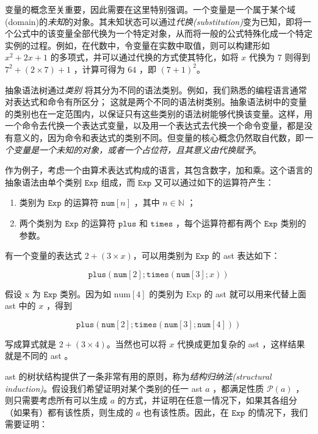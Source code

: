 变量的概念至关重要，因此需要在这里特别强调。一个变量是一个属于某个域(domain)的\emph{未知}的对象。其未知状态可以通过\emph{代换(substitution)}变为已知，即将一个公式中的该变量全部代换为一个特定对象，从而将一般的公式特殊化成一个特定实例的过程。例如，在代数中，令变量在实数中取值，则可以构建形如
\(x^2+2x+1\) 的多项式，并可以通过代换的方式使其特化，如将 \(x\) 代换为
\(7\) 则得到 \(7^2+(2\times 7)+1\) ，计算可得为 \(64\) ，即
\((7+1)^2\)。

抽象语法树通过\emph{类别}
将其分为不同的语法类别。例如，我们熟悉的编程语言通常对表达式和命令有所区分；
这就是两个不同的语法树类别。抽象语法树中的变量的类别也在一定范围内，以保证只有这些类别的语法树能够代换该变量。这样，用一个命令去代换一个表达式变量，以及用一个表达式去代换一个命令变量，都是没有意义的，因为命令和表达式的类别不同。但变量的核心概念仍然取自代数，即\emph{一个变量是一个未知的对象，或者一个占位符，且其意义由代换赋予}。

作为例子，考虑一个由算术表达式构成的语言，其包含数字，加和乘。这个语言的抽象语法由单个类别
\(\texttt{Exp}\) 组成，而 \(\texttt{Exp}\) 又可以通过如下的运算符产生：

\begin{enumerate}
\def\labelenumi{\arabic{enumi}.}
\item
  类别为 \(\texttt{Exp}\) 的运算符 \(\texttt{num}[n]\) ，其中
  \(n \in \mathbb{N}\) ；
\item
  两个类别为 \(\texttt{Exp}\) 的运算符 \(\texttt{plus}\) 和
  \(\texttt{times}\) ，每个运算符都有两个 \(\texttt{Exp}\) 类别的参数。
\end{enumerate}

有一个变量的表达式 \(2+(3\times x)\)，可以用类别为 \(\texttt{Exp}\) 的
ast 表达如下：

\[\texttt{plus}(\texttt{num}[2]; \texttt{times}(\texttt{num}[3];x))\]

假设 x 为 \(\texttt{Exp}\) 类别。因为如 \(\text{num}[4]\) 的类别为
\(\text{Exp}\) 的 ast 就可以用来代替上面 ast 中的 \(x\) ，得到

\[\texttt{plus}(\texttt{num}[2]; \texttt{times}(\texttt{num}[3];\texttt{num}[4]))\]

写成算式就是 \(2+(3\times 4)\)。当然也可以将 \(x\) 代换成更加复杂的 ast
，这样结果就是不同的 ast 。

ast 的树状结构提供了一条非常有用的原则，称为\emph{结构归纳法(structural
induction)}。假设我们希望证明对某个类别的任一 ast \(a\) ，都满足性质
\(\mathcal{P}(a)\) ，则只需要考虑所有可以生成 \(a\)
的方式，并证明在任意一情况下，如果其各组分（如果有）都有该性质，则生成的
\(a\) 也有该性质。因此，在 \(\texttt{Exp}\) 的情况下，我们需要证明：

